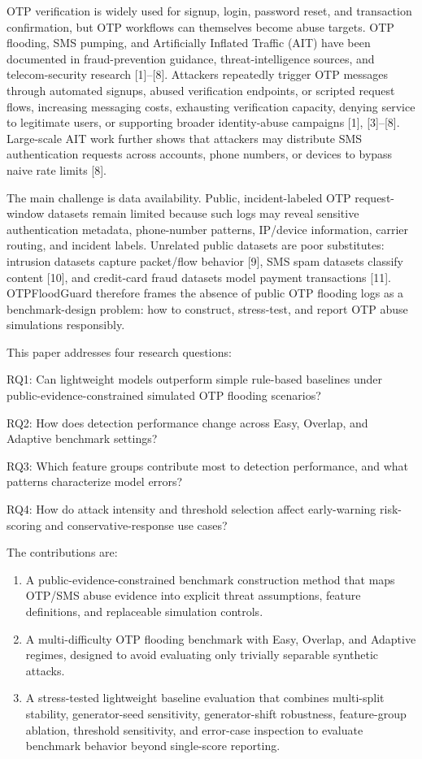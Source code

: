 \documentclass[conference]{IEEEtran}
\begin{document}
OTP verification is widely used for signup, login, password reset, and transaction confirmation, but OTP workflows can themselves become abuse targets. OTP flooding, SMS pumping, and Artificially Inflated Traffic (AIT) have been documented in fraud-prevention guidance, threat-intelligence sources, and telecom-security research [1]--[8]. Attackers repeatedly trigger OTP messages through automated signups, abused verification endpoints, or scripted request flows, increasing messaging costs, exhausting verification capacity, denying service to legitimate users, or supporting broader identity-abuse campaigns [1], [3]--[8]. Large-scale AIT work further shows that attackers may distribute SMS authentication requests across accounts, phone numbers, or devices to bypass naive rate limits [8].

The main challenge is data availability. Public, incident-labeled OTP request-window datasets remain limited because such logs may reveal sensitive authentication metadata, phone-number patterns, IP/device information, carrier routing, and incident labels. Unrelated public datasets are poor substitutes: intrusion datasets capture packet/flow behavior [9], SMS spam datasets classify content [10], and credit-card fraud datasets model payment transactions [11]. OTPFloodGuard therefore frames the absence of public OTP flooding logs as a benchmark-design problem: how to construct, stress-test, and report OTP abuse simulations responsibly.

This paper addresses four research questions:

RQ1: Can lightweight models outperform simple rule-based baselines under public-evidence-constrained simulated OTP flooding scenarios?

RQ2: How does detection performance change across Easy, Overlap, and Adaptive benchmark settings?

RQ3: Which feature groups contribute most to detection performance, and what patterns characterize model errors?

RQ4: How do attack intensity and threshold selection affect early-warning risk-scoring and conservative-response use cases?

The contributions are:

\begin{enumerate}

\item A public-evidence-constrained benchmark construction method that maps OTP/SMS abuse evidence into explicit threat assumptions, feature definitions, and replaceable simulation controls.

\item A multi-difficulty OTP flooding benchmark with Easy, Overlap, and Adaptive regimes, designed to avoid evaluating only trivially separable synthetic attacks.

\item A stress-tested lightweight baseline evaluation that combines multi-split stability, generator-seed sensitivity, generator-shift robustness, feature-group ablation, threshold sensitivity, and error-case inspection to evaluate benchmark behavior beyond single-score reporting.

\end{enumerate}
\end{document}
